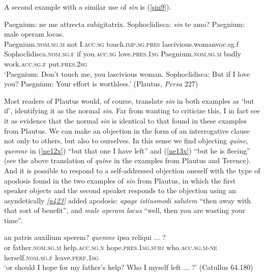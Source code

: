 A second example with a similar use of \emph{sin} is (\ref{sin9}).

\begin{exe}
\ex
\gll Paegnium: ne me attrecta subigitatrix. Sophoclidisca: \emph{sin} te amo? Paegnium: male operam locas.\\
Paegnium.\textsc{nom.sg.m} not I.\textsc{acc.sg} touch.\textsc{imp.sg.pres} lascivious.woman{voc.sg.f} Sophoclidisca.\textsc{nom.sg.f} if you.\textsc{acc.sg} love.\textsc{pres.1sg} Paegnium.\textsc{nom.sg.m} badly work.\textsc{acc.sg.f} put.\textsc{pres.2sg}\\
\trans `Paegnium: Don't touch me, you lascivious woman. Sophoclidisca: But if I love you? Paegnium: Your effort is worthless.' (Plautus, \textit{Persa} 227) 
\label{sin9}
\end{exe}

Most readers of Plautus would, of course, translate \emph{sin} in both examples as `but if', identifying it as the normal \emph{sin}. Far from wanting to criticize this, I in fact see it as evidence that the normal \emph{sin} is identical to that found in these examples from Plautus. We can make an objection in the form of an interrogative clause not only to others, but also to ourselves. In this sense we find objecting \emph{quine}, \emph{quemne} in (\ref{ne12x}) ``but that one I have left'' and (\ref{ne13x}) ``but he is fleeing'' (see the above translation of \emph{quine} in the examples from Plautus and Terence). And it is possible to respond to a self-addressed objection oneself with the type of apodosis found in the two examples of \emph{sin} from Plautus, in which the first speaker objects and the second speaker responds to the objection using an asyndetically \hyperlink{p423}{\emph{[p423]}} added apodosis: \emph{apage istiusmodi salutem} ``then away with that sort of benefit'', and \emph{male operam locus} ``well, then you are wasting your time''.

\begin{exe}
\ex
\gll an patris auxilium sperem? \emph{quemne} ipsa reliqui ... ?\\
or father.\textsc{nom.sg.m} help.\textsc{acc.sg.n} hope.\textsc{pres.1sg.subj} who.\textsc{acc.sg.m}-\textsc{ne} herself.\textsc{nom.sg.f} leave.\textsc{perf.1sg}\\
\trans `or should I hope for my father's help? Who I myself left ... ?' (Catullus 64.180) 
\label{ne12x}
\end{exe}

